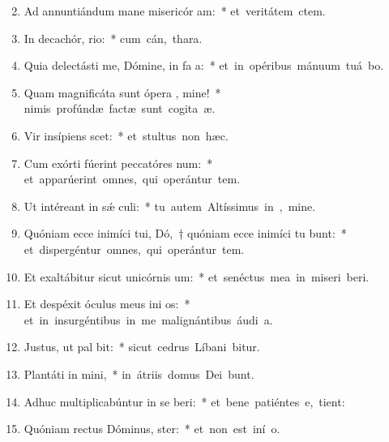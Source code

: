 \begin{flushleft}
\begin{enumerate}[leftmargin=*]
\setcounter{enumi}{1}


\item Ad annuntiándum mane misericór am:~* \mbox{et veritátem   ctem.}
\item In decachór, rio:~* \mbox{cum cán,  thara.}
\item Quia delectásti me, Dómine, in fa a:~* \mbox{et in opéribus mánuum tuá bo.}
\item Quam magnificáta sunt ópera , mine!~* \mbox{nimis profúndæ factæ sunt cogita æ.}
\item Vir insípiens  scet:~* \mbox{et stultus non  hæc.}
\item Cum exórti fúerint peccatóres  num:~* \mbox{et apparúerint omnes, qui operántur tem.}
\item Ut intéreant in s\'{\ae} culi:~* \mbox{tu autem Altíssimus in , mine.}
\item Quóniam ecce inimíci tui, Dó,~† quóniam ecce inimíci tu bunt:~* \mbox{et dispergéntur omnes, qui operántur tem.}
\item Et exaltábitur sicut unicórnis  um:~* \mbox{et senéctus mea in miseri beri.}
\item Et despéxit óculus meus ini os:~* \mbox{et in insurgéntibus in me malignántibus áudi  a.}
\item Justus, ut pal bit:~* \mbox{sicut cedrus Líbani bitur.}
\item Plantáti in  mini,~* \mbox{in átriis domus Dei  bunt.}
\item Adhuc multiplicabúntur in se beri:~* \mbox{et bene patiéntes e,  tient:}
\item Quóniam rectus Dóminus,  ster:~* \mbox{et non est iní  o.}

\end{enumerate}
\end{flushleft}

